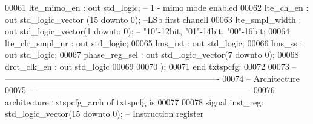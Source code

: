 \begin{DoxyCode}
00061         \textcolor{vhdlchar}{lte_mimo_en}             \textcolor{vhdlchar}{:} \textcolor{keywordflow}{out} \textcolor{comment}{std\_logic};\textcolor{keyword}{    -- 1 - mimo mode enabled}
00062         \textcolor{vhdlchar}{lte_ch_en}               \textcolor{vhdlchar}{:} \textcolor{keywordflow}{out} \textcolor{comment}{std\_logic\_vector} \textcolor{vhdlchar}{(}\textcolor{vhdllogic}{}\textcolor{vhdllogic}{15} \textcolor{keywordflow}{downto} \textcolor{vhdllogic}{}\textcolor{vhdllogic}{0}\textcolor{vhdlchar}{)};\textcolor{keyword}{   --LSb first chanell}
00063         \textcolor{vhdlchar}{lte_smpl_width}          \textcolor{vhdlchar}{:} \textcolor{keywordflow}{out} \textcolor{comment}{std\_logic\_vector}\textcolor{vhdlchar}{(}\textcolor{vhdllogic}{}\textcolor{vhdllogic}{1} \textcolor{keywordflow}{downto} \textcolor{vhdllogic}{}\textcolor{vhdllogic}{0}\textcolor{vhdlchar}{)};\textcolor{keyword}{     -- "10"-12bit, "01"-14bit,
       "00"-16bit;}
00064         \textcolor{vhdlchar}{lte_clr_smpl_nr}     \textcolor{vhdlchar}{:} \textcolor{keywordflow}{out} \textcolor{comment}{std\_logic};
00065         \textcolor{vhdlchar}{lms_rst}                 \textcolor{vhdlchar}{:} \textcolor{keywordflow}{out} \textcolor{comment}{std\_logic};
00066         \textcolor{vhdlchar}{lms_ss}                  \textcolor{vhdlchar}{:} \textcolor{keywordflow}{out} \textcolor{comment}{std\_logic};
00067         \textcolor{vhdlchar}{phase_reg_sel}           \textcolor{vhdlchar}{:} \textcolor{keywordflow}{out} \textcolor{comment}{std\_logic\_vector}\textcolor{vhdlchar}{(}\textcolor{vhdllogic}{}\textcolor{vhdllogic}{7} \textcolor{keywordflow}{downto} \textcolor{vhdllogic}{}\textcolor{vhdllogic}{0}\textcolor{vhdlchar}{)};
00068         \textcolor{vhdlchar}{drct_clk_en}             \textcolor{vhdlchar}{:} \textcolor{keywordflow}{out} \textcolor{comment}{std\_logic}
00069 
00070     \textcolor{vhdlchar}{)};
00071 \textcolor{keywordflow}{end} \textcolor{vhdlchar}{txtspcfg};
00072 
00073 \textcolor{keyword}{-- ----------------------------------------------------------------------------}
00074 \textcolor{keyword}{-- Architecture}
00075 \textcolor{keyword}{-- ----------------------------------------------------------------------------}
00076 \textcolor{keywordflow}{architecture} txtspcfg\_arch \textcolor{keywordflow}{of} txtspcfg is
00077 
00078     \textcolor{keywordflow}{signal} \textcolor{vhdlchar}{inst_reg}\textcolor{vhdlchar}{:} \textcolor{comment}{std\_logic\_vector}\textcolor{vhdlchar}{(}\textcolor{vhdllogic}{}\textcolor{vhdllogic}{15} \textcolor{keywordflow}{downto} \textcolor{vhdllogic}{}\textcolor{vhdllogic}{0}\textcolor{vhdlchar}{)};\textcolor{keyword}{     -- Instruction register}

\end{DoxyCode}
